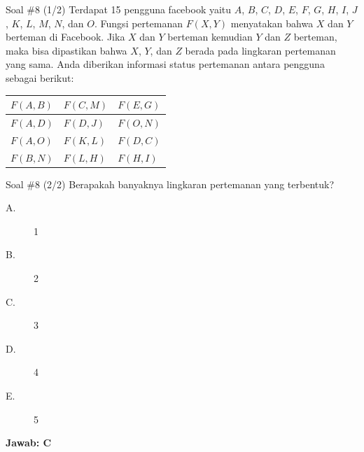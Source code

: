 \documentclass[english,t]{beamer}
\begin{document}
	\begin{frame}{Soal \#8 (1/2)}
		Terdapat 15 pengguna facebook yaitu $A$, $B$, $C$, $D$, $E$, $F$, $G$, $H$, $I$, $J$, $K$, $L$, $M$, $N$, dan $O$. Fungsi pertemanan $F(X,Y)$ menyatakan bahwa $X$ dan $Y$ berteman di Facebook. Jika $X$ dan $Y$ berteman kemudian $Y$ dan $Z$ berteman, maka bisa dipastikan bahwa $X$, $Y$, dan $Z$ berada pada lingkaran pertemanan yang sama. Anda diberikan informasi status pertemanan antara pengguna sebagai berikut:
		\begin{table}[!ht]
			\centering
			\begin{tabular}{|l|l|l|}
				\hline
				$F(A,B)$ & $F(C,M)$ & $F(E,G)$ \\
				\hline
				$F(A,D)$ & $F(D,J)$ & $F(O,N)$ \\
				\hline
				$F(A,O)$ & $F(K,L)$ & $F(D,C)$ \\
				\hline
				$F(B,N)$ & $F(L,H)$ & $F(H,I)$ \\
				\hline
			\end{tabular}
		\end{table}
	\end{frame}

	\begin{frame}{Soal \#8 (2/2)}
	Berapakah banyaknya lingkaran pertemanan yang terbentuk?
	\begin{description}
		\item[A.] 1
		\item[B.] 2
		\item[C.] 3
		\item[D.] 4
		\item[E.] 5
	\end{description}		
	\pause \textbf{Jawab: C}	
	\end{frame}
\end{document}
